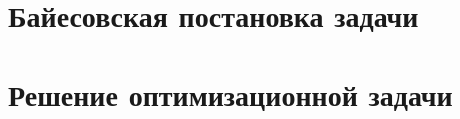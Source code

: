 \documentclass[12pt,a4paper]{article}
\begin{document}

	\section{Байесовская постановка задачи} 
	\section{Решение оптимизационной задачи} 
	
	\newpage
\end{document}
